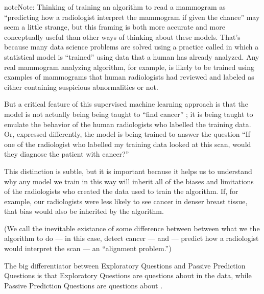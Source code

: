 \documentclass[letterpaper,10pt,english]{jupyterBook}
\begin{document}
\begin{sphinxadmonition}{note}{Note:}
\sphinxAtStartPar
Thinking of training an algorithm to read a mammogram as “predicting how a radiologist  interpret the mammogram if given the chance” may seem a little strange, but this framing is both more accurate and more conceptually useful than other ways of thinking about these models. That’s because many data science problems are solved using a practice called  in which a statistical model is “trained” using data that a human has already analyzed. Any real mammogram analyzing algorithm, for example,  is likely to be trained using examples of mammograms that human radiologists had reviewed and labeled as either containing suspicious abnormalities or not.

\sphinxAtStartPar
But a critical feature of this supervised machine learning approach is that the model is not actually being being taught to “find cancer” ; it is being taught to emulate the behavior of the human radiologists who labelled the training data. Or, expressed differently, the model is being trained to answer the question “If one of the radiologist who labelled my training data looked at this scan, would they diagnose the patient with cancer?”

\sphinxAtStartPar
This distinction is subtle, but it is important because it helps us to understand why any model we train in this way will inherit all of the biases and limitations of the radiologists who created the data used to train the algorithm. If, for example, our radiologists were less likely to see cancer in denser breast tissue, that bias would also be inherited by the algorithm.

\sphinxAtStartPar
(We call the inevitable existance of some difference between between what we  the algorithm to do — in this case, detect cancer — and  — predict how a radiologist would interpret the scan — an “alignment problem.”)
\end{sphinxadmonition}

\sphinxAtStartPar
The big differentiator between Exploratory Questions and Passive Prediction Questions is that Exploratory Questions are questions about  in the data, while Passive Prediction Questions are questions about .
\end{document}
